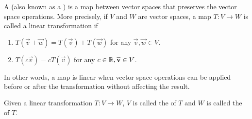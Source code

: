 
\begin{definition}
A  (also known as a )
is a map between vector spaces that preserves the vector space operations.
More precisely, if \(V\) and \(W\) are vector spaces, a map
\(T:V\rightarrow W\) is called a linear transformation if
\begin{enumerate}
\item \(T(\vec{v}+\vec{w}) = T(\vec{v})+T(\vec{w})\)
      for any \(\vec{v},\vec{w} \in V\).
\item \(T(c\vec{v}) = cT(\vec{v})\)
      for any \(c \in \mathbb{R},\mathbf{\accentset{\rightharpoonup}{v}} \in V\).
\end{enumerate}
In other words, a map is linear when vector space operations
can be applied before or after the transformation without affecting the result.
\end{definition}

\begin{definition}
Given a linear transformation \(T:V\to W\),
\(V\) is called the  of \(T\) and
\(W\) is called the  of \(T\).

\begin{center}
\end{center}
\end{definition}

